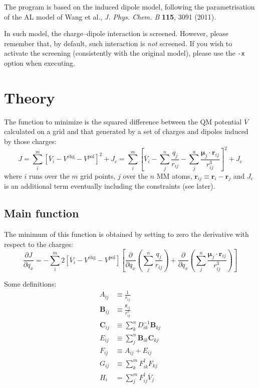 \documentclass[a4paper]{report}
\newcommand{\bs}{\boldsymbol}
\newcommand{\mr}{\mathrm}
\begin{document}
The program is based on the induced dipole model, following the parametrisation of the AL model of Wang et al., \emph{J. Phys. Chem. B} \textbf{115}, 3091 (2011).

In such model, the charge--dipole interaction is screened. However, please remember that, by default, such interaction is \emph{not} screened. If you wish to activate the screening (consistently with the original model), please use the \texttt{-x} option when executing.

\section*{Theory}

The function to minimize is the squared difference between the QM potential
$\overline{V}$ calculated on a grid and that generated by a set of charges and
dipoles induced by those charges:
\begin{equation}
J = \sum_i^m \left[ \overline{V}_i - V^\mr{chg} - V^\mr{pol} \right]^2 + J_\mr{c} = \sum_i^m
\left[ \overline{V}_i - \sum_j^n \frac{q_j}{r_{ij}} - \sum_j^n \frac{\bs{\mu}_j \cdot
\bs{r}_{ij}}{r_{ij}^3} \right]^2 + J_\mr{c}
\end{equation}
where $i$ runs over the $m$ grid points, $j$ over the $n$ MM atoms,
$\bs{r}_{ij}\equiv\bs{r}_i - \bs{r}_j$ and $J_\mr{c}$ is an additional term
eventually including the constraints (see later).

\subsection*{Main function}

The minimum of this function is obtained by setting to zero the derivative with
respect to the charges:
\begin{equation}
\label{deriv}
\frac{\partial J}{\partial q_x} = - \sum_i^m 2 \left[ \overline{V}_i - V^\mr{chg} -
V^\mr{pol} \right] \left[ \frac{\partial}{\partial q_x} \left(\sum_j^n
\frac{q_j}{r_{ij}}\right) + \frac{\partial}{\partial q_x} \left(\sum_j^n
\frac{\bs{\mu}_j \cdot \bs{r}_{ij}}{r_{ij}^3} \right)\right]
\end{equation}

Some definitions:
\begin{align}
A_{ij} &\equiv \frac{1}{r_{ij}} \\
\bs{B}_{ij} &\equiv \frac{\bs{r}_{ij}}{r_{ij}^3} \\
\bs{C}_{ij} &\equiv \sum_k^n D^{-1}_{ik}\bs{B}_{kj} \\
E_{ij} &\equiv \sum_j^n \bs{B}_{ik} \bs{C}_{kj} \\
F_{ij} &\equiv A_{ij} + E_{ij} \\
G_{ij} &\equiv \sum_k^m F_{ik}^\dagger F_{kj} \\
H_i &= \sum_j^m F_{ij}^\dagger \overline{V}_j 
\end{align}
\end{document}

